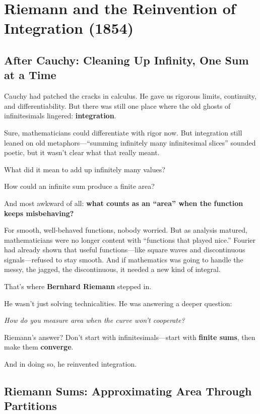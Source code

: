 \section{Riemann and the Reinvention of Integration (1854)}

\subsection{After Cauchy: Cleaning Up Infinity, One Sum at a Time}

Cauchy had patched the cracks in calculus. He gave us rigorous limits, continuity, and differentiability. But there was still one place where the old ghosts of infinitesimals lingered: \textbf{integration}.

Sure, mathematicians could differentiate with rigor now. But integration still leaned on old metaphors—“summing infinitely many infinitesimal slices” sounded poetic, but it wasn’t clear what that really meant.

What did it mean to add up infinitely many values?

How could an infinite sum produce a finite area?

And most awkward of all: \textbf{what counts as an “area” when the function keeps misbehaving?}

For smooth, well-behaved functions, nobody worried. But as analysis matured, mathematicians were no longer content with “functions that played nice.” Fourier had already shown that useful functions—like square waves and discontinuous signals—refused to stay smooth. And if mathematics was going to handle the messy, the jagged, the discontinuous, it needed a new kind of integral.

That’s where \textbf{Bernhard Riemann} stepped in.

He wasn’t just solving technicalities. He was answering a deeper question:

\begin{center}
\emph{How do you measure area when the curve won’t cooperate?}
\end{center}

Riemann’s answer? Don’t start with infinitesimals—start with \textbf{finite sums}, then make them \textbf{converge}.

And in doing so, he reinvented integration.

\subsection{Riemann Sums: Approximating Area Through Partitions}

